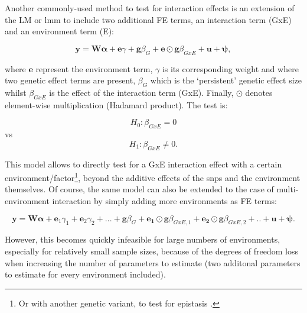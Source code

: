 

Another commonly-used method to test for interaction effects is an extension of the LM or \gls{lmm} to include two additional FE terms, an interaction term (GxE) and an environment term (E):

\begin{equation}\label{eq:Interaction_test_FE_LMM}
 \mathbf{y} =  \mathbf{W}\boldsymbol{\alpha} + \mathbf{e}\gamma  + \mathbf{g}\beta_G + \mathbf{e}\odot\mathbf{g}\beta_{GxE} + \mathbf{u} + \boldsymbol{\psi}, 
\end{equation}

where $\mathbf{e}$ represent the environment term, $\gamma$ is its corresponding weight and where two genetic effect terms are present, $\beta_G$ which is the `persistent' genetic effect size whilst $\beta_{GxE}$ is the effect of the interaction term (GxE).
Finally, $\odot$ denotes element-wise multiplication (Hadamard product).
The test is:

\begin{equation}
 H_{0}: \beta_{GxE}=0 
\end{equation}
vs
\begin{equation}
 H_{1}: \beta_{GxE} \neq 0. 
\end{equation}

This model allows to directly test for a GxE interaction effect with a certain environment/factor\footnote{Or with another genetic variant, to test for epistasis \cite{wei2014detecting}.}, beyond the additive effects of the \gls{snp}s and the environment themselves. 
Of course, the same model can also be extended to the case of multi-environment interaction by simply adding more environments as FE terms:

\begin{equation}\label{eq:multi_interaction_test_FE_LMM}
 \mathbf{y} =  \mathbf{W}\boldsymbol{\alpha} + \mathbf{e}_1\gamma_1 + \mathbf{e}_2\gamma_2 + ...  + \mathbf{g}\beta_G + \mathbf{e_1}\odot\mathbf{g}\beta_{GxE,1}+ \mathbf{e_2}\odot\mathbf{g}\beta_{GxE,2} + .. + \mathbf{u} + \boldsymbol{\psi}. 
\end{equation}

However, this becomes quickly infeasible for large numbers of environments, especially for relatively small sample sizes, because of the degrees of freedom loss when increasing the number of parameters to estimate (two additonal parameters to estimate for every environment included). \\

